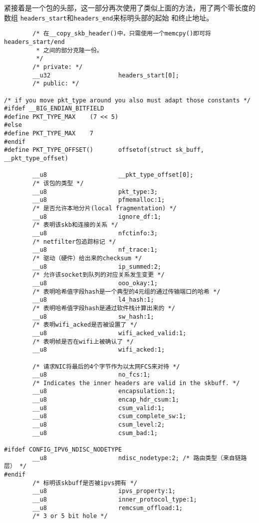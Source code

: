 紧接着是一个包的头部，这一部分再次使用了类似上面的方法，用了两个零长度的数组
\texttt{headers_start}和\texttt{headers_end}来标明头部的起始
和终止地址。
\begin{verbatim}
        /* 在__copy_skb_header()中，只需使用一个memcpy()即可将headers_start/end
         * 之间的部分克隆一份。
         */
        /* private: */
        __u32                   headers_start[0];
        /* public: */

/* if you move pkt_type around you also must adapt those constants */
#ifdef __BIG_ENDIAN_BITFIELD
#define PKT_TYPE_MAX    (7 << 5)
#else
#define PKT_TYPE_MAX    7
#endif
#define PKT_TYPE_OFFSET()       offsetof(struct sk_buff, __pkt_type_offset)

        __u8                    __pkt_type_offset[0];
        /* 该包的类型 */
        __u8                    pkt_type:3;
        __u8                    pfmemalloc:1;
        /* 是否允许本地分片(local fragmentation) */
        __u8                    ignore_df:1; 
        /* 表明该skb和连接的关系 */
        __u8                    nfctinfo:3;
        /* netfilter包追踪标记 */
        __u8                    nf_trace:1;
        /* 驱动（硬件）给出来的checksum */
        __u8                    ip_summed:2;
        /* 允许该socket到队列的对应关系发生变更 */
        __u8                    ooo_okay:1;
        /* 表明哈希值字段hash是一个典型的4元组的通过传输端口的哈希 */
        __u8                    l4_hash:1;
        /* 表明哈希值字段hash是通过软件栈计算出来的 */
        __u8                    sw_hash:1;
        /* 表明wifi_acked是否被设置了 */
        __u8                    wifi_acked_valid:1;
        /* 表明帧是否在wifi上被确认了 */
        __u8                    wifi_acked:1;
        
        /* 请求NIC将最后的4个字节作为以太网FCS来对待 */
        __u8                    no_fcs:1;
        /* Indicates the inner headers are valid in the skbuff. */
        __u8                    encapsulation:1;
        __u8                    encap_hdr_csum:1;
        __u8                    csum_valid:1;
        __u8                    csum_complete_sw:1;
        __u8                    csum_level:2;
        __u8                    csum_bad:1;

#ifdef CONFIG_IPV6_NDISC_NODETYPE
        __u8                    ndisc_nodetype:2; /* 路由类型（来自链路层） */
#endif
        /* 标明该skbuff是否被ipvs拥有 */
        __u8                    ipvs_property:1;
        __u8                    inner_protocol_type:1;
        __u8                    remcsum_offload:1;
        /* 3 or 5 bit hole */


\end{verbatim}
